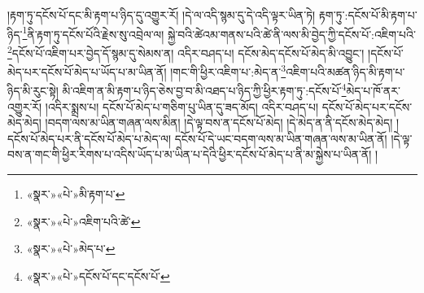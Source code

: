 །རྟག་ཏུ་དངོས་པོ་དང་མི་རྟག་པ་ཉིད་དུ་འགྱུར་རོ། །དེ་ལ་འདི་སྙམ་དུ་དེ་འདི་ལྟར་ཡིན་ཏེ། རྟག་ཏུ་:དངོས་པོ་མི་རྟག་པ་ཉིད་\footnote{«སྣར་»«པེ་»མི་རྟག་པ་}ནི་རྟག་ཏུ་དངོས་པོའི་རྗེས་སུ་འབྲེལ་ལ། སྐྱེ་བའི་ཚེའམ་གནས་པའི་ཚེ་ནི་ལས་མི་བྱེད་ཀྱི་དངོས་པོ་:འཇིག་པའི་\footnote{«སྣར་»«པེ་»འཇིག་པའི་ཚེ་}དངོས་པོ་འཇིག་པར་བྱེད་དོ་སྙམ་དུ་སེམས་ན། འདིར་བཤད་པ། དངོས་མེད་དངོས་པོ་མེད་མི་འབྱུང་། །དངོས་པོ་མེད་པར་དངོས་པོ་མེད་པ་ཡོད་པ་མ་ཡིན་ནོ། །གང་གི་ཕྱིར་འཇིག་པ་:མེད་ན་\footnote{«སྣར་»«པེ་»མེད་པ་}འཇིག་པའི་མཚན་ཉིད་མི་རྟག་པ་ཉིད་མི་རུང་སྟེ། མི་འཇིག་ན་མི་རྟག་པ་ཉིད་ཅེས་བྱ་བ་མི་འཐད་པ་ཉིད་ཀྱི་ཕྱིར་རྟག་ཏུ་:དངོས་པོ་\footnote{«སྣར་»«པེ་»དངོས་པོ་དང་དངོས་པོ་}མེད་པ་ཁོ་ནར་འགྱུར་རོ། །འདིར་སྨྲས་པ། དངོས་པོ་མེད་པ་གཅིག་པུ་ཡིན་དུ་ཟད་མོད། འདིར་བཤད་པ། དངོས་པོ་མེད་པར་དངོས་མེད་མེད། །བདག་ལས་མ་ཡིན་གཞན་ལས་མིན། །དེ་ལྟ་བས་ན་དངོས་པོ་མེད། །དེ་མེད་ན་ནི་དངོས་མེད་མེད། །དངོས་པོ་མེད་པར་ནི་དངོས་པོ་མེད་པ་མེད་ལ། དངོས་པོ་དེ་ཡང་བདག་ལས་མ་ཡིན་གཞན་ལས་མ་ཡིན་ནོ། །དེ་ལྟ་བས་ན་གང་གི་ཕྱིར་རིགས་པ་འདིས་ཡོད་པ་མ་ཡིན་པ་དེའི་ཕྱིར་དངོས་པོ་མེད་པ་ནི་མ་སྐྱེས་པ་ཡིན་ནོ། །
